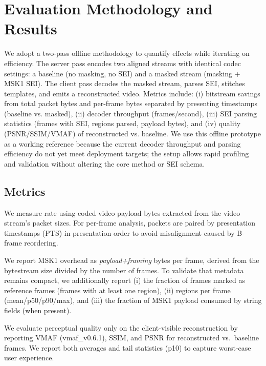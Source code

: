 \section{Evaluation Methodology and Results}
\label{sec:evaluation}

We adopt a two-pass offline methodology to quantify effects while iterating on efficiency. The server pass encodes two aligned streams with identical codec settings: a baseline (no masking, no SEI) and a masked stream (masking + MSK1 SEI). The client pass decodes the masked stream, parses SEI, stitches templates, and emits a reconstructed video. Metrics include: (i) bitstream savings from total packet bytes and per-frame bytes separated by presenting timestamps (baseline vs. masked), (ii) decoder throughput (frames/second), (iii) SEI parsing statistics (frames with SEI, regions parsed, payload bytes), and (iv) quality (PSNR/SSIM/VMAF) of reconstructed vs. baseline. We use this offline prototype as a working reference because the current decoder throughput and parsing efficiency do not yet meet deployment targets; the setup allows rapid profiling and validation without altering the core method or SEI schema.

\subsection{Metrics}
\label{sec:evaluation:metrics}

We measure rate using coded video payload bytes extracted from the video stream’s packet sizes. For per-frame analysis, packets are paired by presentation timestamps (PTS) in presentation order to avoid misalignment caused by B-frame reordering.

We report MSK1 overhead as \emph{payload+framing} bytes per frame, derived from the bytestream size divided by the number of frames. To validate that metadata remains compact, we additionally report (i) the fraction of frames marked as reference frames (frames with at least one region), (ii) regions per frame (mean/p50/p90/max), and (iii) the fraction of MSK1 payload consumed by string fields (when present).

We evaluate perceptual quality only on the client-visible reconstruction by reporting VMAF (vmaf\_v0.6.1), SSIM, and PSNR for reconstructed vs.\ baseline frames. We report both averages and tail statistics (p10) to capture worst-case user experience.

